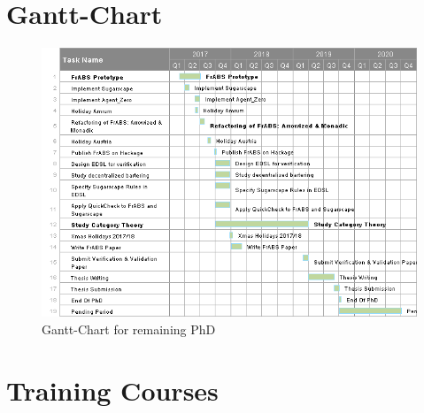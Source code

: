 \begin{appendices}

\chapter{Gantt-Chart}
\label{app:gantt}

\begin{landscape}
	\begin{figure}
		\label{fig:gantt}
  		\caption{Gantt-Chart for remaining PhD}
  		\centering
  		\includegraphics[width=1.0\textwidth]{./charts/gantt.png}
	\end{figure}
\end{landscape}



\chapter{Training Courses}
\label{app:courses}


\end{appendices}
